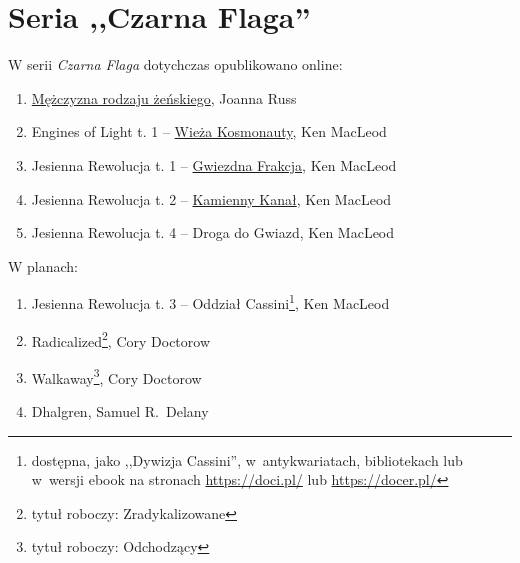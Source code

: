 \documentclass[oneside,polish,11pt,sfheadings]{mwbk}
\begin{document}
\chapter*{Seria ,,Czarna Flaga''}

\begin{center}
\begin{large}
W serii \textit{Czarna Flaga} dotychczas opublikowano online:
\end{large} 
\end{center}


\begin{enumerate}
\item \href{https://archive.org/details/joanna-russ-mezczyzna-rodzaju-zenskiego/Joanna_Russ_M\%C4\%99\%C5\%BCczyzna_rodzaju_\%C5\%BCe\%C5\%84skiego}{Mężczyzna rodzaju żeńskiego}, Joanna Russ
\item Engines of Light t. 1 -- \href{https://archive.org/details/ken-macleod-wieza-kosmonauty}{Wieża Kosmonauty}, Ken MacLeod
\item Jesienna Rewolucja t. 1 -- \href{https://archive.org/details/ken-mac-leod-jesienna-rewolucja-gwiezdna-frakcja}{Gwiezdna Frakcja}, Ken MacLeod
\item Jesienna Rewolucja t. 2 -- \href{https://archive.org/details/ken-mac-leod-jesienna-rewolucja-kamienny-kanal}{Kamienny Kanał}, Ken MacLeod
\item Jesienna Rewolucja t. 4 --  Droga do Gwiazd, Ken MacLeod
\end{enumerate}

\begin{center}

\begin{large}W planach:\end{large}\end{center}

\begin{enumerate}
\item Jesienna Rewolucja t. 3 -- Oddział Cassini\footnote{dostępna, jako ,,Dywizja Cassini'', w~antykwariatach, bibliotekach lub w~wersji ebook na stronach \url{https://doci.pl/} lub \url{https://docer.pl/}}, Ken MacLeod
\item Radicalized\footnote{tytuł roboczy: Zradykalizowane}, Cory Doctorow
\item Walkaway\footnote{tytuł roboczy: Odchodzący}, Cory Doctorow
\item Dhalgren, Samuel R.~Delany
\end{enumerate}

\newpage
\end{document}
